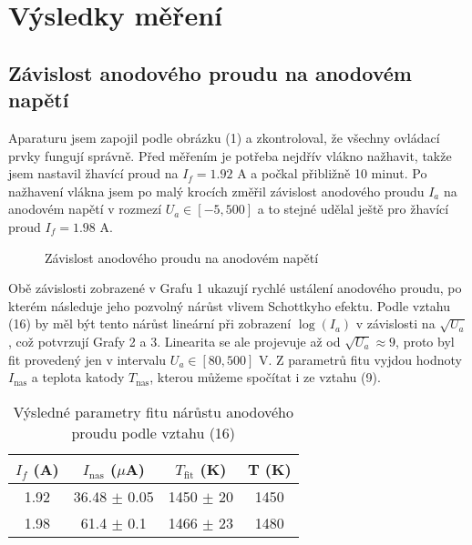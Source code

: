 \documentclass[a4paper,11pt]{article}
\begin{document}
\newpage

\section{Výsledky měření}

\subsection{Závislost anodového proudu na anodovém napětí}

Aparaturu jsem zapojil podle obrázku (1) a zkontroloval, že všechny ovládací prvky fungují správně. Před měřením je potřeba nejdřív vlákno nažhavit, takže jsem nastavil žhavící proud na $ I_f = 1.92 $ A a počkal přibližně 10 minut. Po nažhavení vlákna jsem po malý krocích změřil závislost anodového proudu $ I_a $  na anodovém napětí v rozmezí $ U_a \in [-5, 500] $ a to stejné udělal ještě pro žhavící proud $ I_f = 1.98 $ A. 

\begin{figure}[h]
    \centering
    
    \captionsetup{type=graph}
    \caption{ Závislost anodového proudu na anodovém napětí}
\end{figure}

Obě závislosti zobrazené v Grafu 1 ukazují rychlé ustálení anodového proudu, po kterém následuje jeho pozvolný nárůst vlivem Schottkyho efektu. Podle vztahu (16) by měl být tento nárůst lineární při zobrazení $ \log(I_a) $ v závislosti na $ \sqrt{U_a}  $, což potvrzují Grafy 2 a 3. Linearita se ale projevuje až od $\sqrt{U_a} \approx 9$, proto byl fit provedený jen v intervalu $U_a \in [80, 500]$ V. Z parametrů fitu vyjdou hodnoty $ I_{\text{nas}} $ a teplota katody $ T_{\text{nas}} $, kterou můžeme spočítat i ze vztahu (9). 

\begin{table}[h]
    \centering
    \begin{tabular}{| c | c c c |}
        \hline
        $ I_f $ ($ $A) & $ I_{\text{nas}} $ ($  \mu$A)  & $ T_{\text{fit}} $  (K) & T (K)  \\
        \hline
        1.92 & 36.48 $ \pm $  0.05 & 1450 $ \pm $ 20 & 1450 \\
        1.98 & 61.4 $ \pm $  0.1 & 1466 $ \pm $ 23 & 1480 \\
        \hline
    \end{tabular}
    \caption{ Výsledné parametry fitu nárůstu anodového proudu podle vztahu (16) }
\end{table}
\vspace{-40pt}
\end{document}
